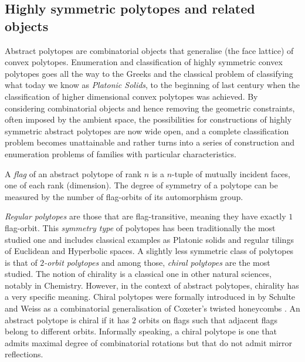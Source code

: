 \subsection*{Highly symmetric polytopes and related objects}

Abstract polytopes are combinatorial objects that generalise (the face lattice) of convex polytopes.
Enumeration and classification of highly symmetric convex polytopes goes all the way to the Greeks and the classical problem of classifying what today we know as \emph{Platonic Solids}, to the beginning of last century when the classification of higher dimensional convex polytopes was achieved.
By considering combinatorial objects and hence removing the geometric constraints, often imposed by the ambient space, the possibilities for constructions of highly symmetric abstract polytopes are now wide open, and a complete classification problem becomes unattainable and rather turns into a series of construction and enumeration problems of families with particular characteristics.

A \emph{flag} of an abstract polytope of rank $n$ is a $n$-tuple of mutually incident faces, one of each rank (dimension). 
The degree of symmetry of a polytope can be measured by the number of flag-orbits of its automorphism group.

\emph{Regular polytopes} are those that are flag-transitive, meaning they have exactly $1$ flag-orbit.
This \emph{symmetry type} of polytopes has been traditionally the most studied one and includes classical examples as Platonic solids and regular tilings of Euclidean and Hyperbolic spaces.
A slightly less symmetric class of polytopes is that of \emph{$2$-orbit polytopes} and among those, \emph{chiral polytopes} are the most studied.
The notion of chirality is a classical one in other natural sciences, notably in Chemistry.
However, in the context of abstract polytopes, chirality has a very specific meaning. 
Chiral polytopes were formally introduced in \cite*{SchulWeiss1991_ChiralPolytopes} by Schulte and Weiss as a combinatorial generalisation of Coxeter's twisted honeycombs \cite*{Coxeter1970_TwistedHoneycombs}.
An abstract polytope is chiral if it has $2$ orbits on flags such that adjacent flags belong to different orbits. 
Informally speaking, a chiral polytope is one that admits maximal degree of combinatorial rotations but that do not admit mirror reflections.

